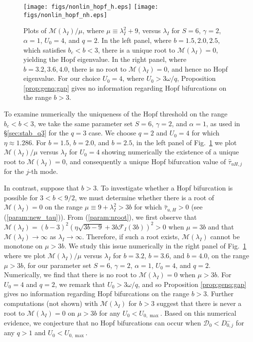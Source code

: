 \documentclass{article}%
\begin{document}
\begin{figure}[htbp]
\centering
\texttt{[image: figs/nonlin\_hopf\_h.eps]}
\texttt{[image: figs/nonlin\_hopf\_nh.eps]}
\caption{\label{fig:nonlin} Plots of ${{\mathcal M}(\lambda_I)/\mu}$,
  where $\mu\equiv \lambda_I^2+9$, versus $\lambda_I$ for $S=6$,
  $\gamma=2$, $\alpha=1$, $U_0=4$, and $q=2$. In the left panel, where
  $b=1.5,2.0,2.5$, which satisfies $b_c<b<3$, there is a unique root
  to ${\mathcal M}(\lambda_I)=0$, yielding the Hopf eigenvalue. In the
  right panel, where $b=3.2,3.6,4.0$, there is no root to ${\mathcal
    M}(\lambda_I)=0$, and hence no Hopf eigenvalue. For our choice
  $U_0=4$, where $U_0>{3\omega/q}$, Proposition \ref{prop:genq:gap}
  gives no information regarding Hopf bifurcations on the range
  $b>3$.}
\end{figure}

To examine numerically the uniqueness of the Hopf threshold on the
range $b_c<b<3$, we take the same parameter set $S=6$, $\gamma=2$, and
$\alpha=1$, as used in \S \ref{sec:stab_q3} for the $q=3$ case. We
choose $q=2$ and $U_0=4$ for which $\eta\approx 1.286$. For $b=1.5$,
$b=2.0$, and $b=2.5$, in the left panel of Fig.~\ref{fig:nonlin} we
plot ${{\mathcal M}(\lambda_I)/\mu}$ versus $\lambda_I$ for $U_0=4$
showing numerically the existence of a unique root to ${\mathcal
  M}(\lambda_I)=0$, and consequently a unique Hopf bifurcation value
of $\hat{\tau}_{uH,j}$ for the $j$-th mode.

In contrast, suppose that $b>3$. To investigate whether a Hopf
bifurcation is possible for $3<b<{9/2}$, we must determine whether
there is a root of ${\mathcal M}(\lambda_I)=0$ on the range $\mu\equiv
9+\lambda_I^2>3b$ for which $\hat{\tau}_{u,H}>0$ (see
(\ref{param:new_tau})). From (\ref{param:nroot}), we first observe
that ${\mathcal M}(\lambda_I)=(b-3)^2\left(\eta \sqrt{3b-9} + 3b
{\mathcal F}_I(3b) \right)^2 >0$ when $\mu=3b$ and that ${\mathcal
  M}(\lambda_I)\to \infty$ as $\lambda_I\to \infty$. Therefore, if
such a root exists, ${\mathcal M}(\lambda_I)$ cannot be monotone on
$\mu>3b$. We study this issue numerically in the right panel of
Fig.~\ref{fig:nonlin} where we plot ${{\mathcal M}(\lambda_I)/\mu}$
versus $\lambda_I$ for $b=3.2$, $b=3.6$, and $b=4.0$, on the range
$\mu>3b$, for our parameter set $S=6$, $\gamma=2$, $\alpha=1$,
$U_0=4$, and $q=2$. Numerically, we find that there is no root to
${\mathcal M}(\lambda_I)=0$ when $\mu>3b$. For $U_0=4$ and $q=2$, we
remark that $U_0>{3\omega/q}$, and so Proposition \ref{prop:genq:gap}
gives no information regarding Hopf bifurcations on the range
$b>3$. Further computations (not shown) with ${\mathcal M}(\lambda_I)$
for $b>3$ suggest that there is never a root to ${\mathcal
  M}(\lambda_I)=0$ on $\mu>3b$ for any $U_0<U_{0,\max}$. Based on this
numerical evidence, we conjecture that no Hopf bifurcations can occur
when ${\mathcal D}_0<D^{-}_{0,j}$ for any $q>1$ and $U_0<U_{0,\max}$.
\end{document}
